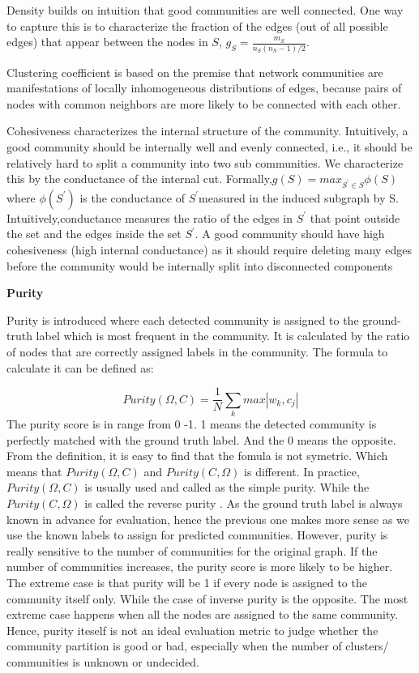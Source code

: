 Density builds on intuition that good communities are well connected. One way to capture this is to characterize the fraction of the edges (out of all possible edges) that appear between the nodes in $S$, $g_S = \frac{m_S}{n_S(n_S-1)/2}$.

Clustering coefficient is based on the premise that network communities are manifestations of locally inhomogeneous distributions of edges, because pairs of nodes with common neighbors are more likely to be connected with each other.

Cohesiveness characterizes the internal structure of the community. Intuitively, a good community should be internally well and evenly connected, i.e., it should be relatively hard to split a community into two sub communities. We characterize this by the conductance of the internal cut. Formally,$g(S)=max_{S^{'} \in S} \phi(S)$ where $\phi(S^{'})$ is the conductance of $S^{'}$measured in the induced subgraph by S. Intuitively,conductance measures the ratio of the edges in $S^{'}$ that point outside the set and the edges inside the set $S^{'}$. A good community should have high cohesiveness (high internal conductance) as it should require deleting many edges before the community would be internally split into disconnected components 

\textbf{Purity}

Purity \cite{schutze2008introduction,lin2005foundations} is introduced where each detected community
is assigned to the ground-truth label which is most frequent in the community. It is calculated by the ratio of nodes that are correctly assigned labels in the community. The formula to calculate it can be defined as:

$$
Purity(\Omega,C) = \frac{1}{N} \sum_{k} max|w_{k},c_{j}|
$$
The purity score is in range from 0 -1. 1 means the detected community is perfectly matched with the ground truth label. And the 0 means the opposite. From the definition, it is easy to find that the fomula is not symetric. Which means that $Purity(\Omega,C)$ and $Purity(C,\Omega)$ is different.   In practice, $Purity(\Omega,C)$ is usually used and called as the simple purity. While the $Purity(C,\Omega)$ is called the reverse purity  \cite{artiles2007semeval,danon2005comparing}. As the ground truth label is always known in advance for evaluation, hence the previous one makes more sense as we use the known labels to assign for predicted communities. However, purity is really sensitive to the number of communities for the original graph. If the number of communities increases, the purity score is more likely to be higher. The extreme case is that purity will be 1 if every node is assigned to the community itself only. While the case of inverse purity is the opposite. The most extreme case happens when all the nodes are assigned to the same community. Hence, purity iteself is not an ideal evaluation metric to judge whether the community partition is good or bad, especially when the number of clusters/ communities is unknown or undecided.

